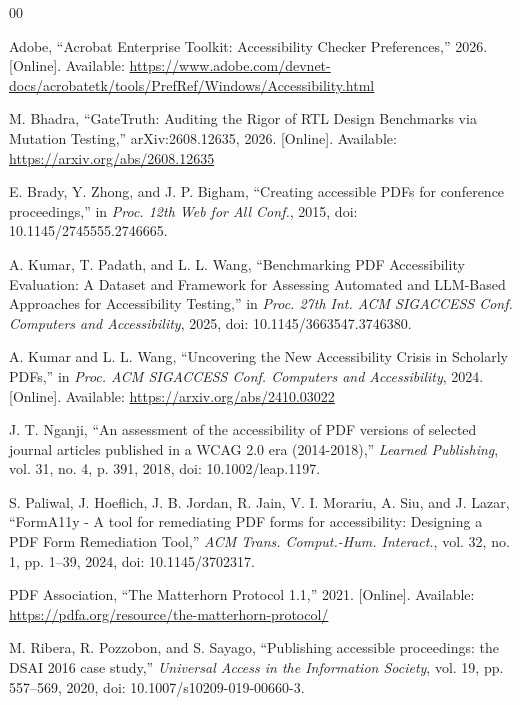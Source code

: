 \documentclass[conference]{IEEEtran}
\begin{document}
\begin{thebibliography}{00}

Adobe, ``Acrobat Enterprise Toolkit: Accessibility Checker Preferences,'' 2026. [Online]. Available: \url{https://www.adobe.com/devnet-docs/acrobatetk/tools/PrefRef/Windows/Accessibility.html}

M. Bhadra, ``GateTruth: Auditing the Rigor of RTL Design Benchmarks via Mutation Testing,'' arXiv:2608.12635, 2026. [Online]. Available: \url{https://arxiv.org/abs/2608.12635}

E. Brady, Y. Zhong, and J. P. Bigham, ``Creating accessible PDFs for conference proceedings,'' in \emph{Proc. 12th Web for All Conf.}, 2015, doi: 10.1145/2745555.2746665.

A. Kumar, T. Padath, and L. L. Wang, ``Benchmarking PDF Accessibility Evaluation: A Dataset and Framework for Assessing Automated and LLM-Based Approaches for Accessibility Testing,'' in \emph{Proc. 27th Int. ACM SIGACCESS Conf. Computers and Accessibility}, 2025, doi: 10.1145/3663547.3746380.

A. Kumar and L. L. Wang, ``Uncovering the New Accessibility Crisis in Scholarly PDFs,'' in \emph{Proc. ACM SIGACCESS Conf. Computers and Accessibility}, 2024. [Online]. Available: \url{https://arxiv.org/abs/2410.03022}

J. T. Nganji, ``An assessment of the accessibility of PDF versions of selected journal articles published in a WCAG 2.0 era (2014-2018),'' \emph{Learned Publishing}, vol. 31, no. 4, p. 391, 2018, doi: 10.1002/leap.1197.

S. Paliwal, J. Hoeflich, J. B. Jordan, R. Jain, V. I. Morariu, A. Siu, and J. Lazar, ``FormA11y - A tool for remediating PDF forms for accessibility: Designing a PDF Form Remediation Tool,'' \emph{ACM Trans. Comput.-Hum. Interact.}, vol. 32, no. 1, pp. 1--39, 2024, doi: 10.1145/3702317.

PDF Association, ``The Matterhorn Protocol 1.1,'' 2021. [Online]. Available: \url{https://pdfa.org/resource/the-matterhorn-protocol/}

M. Ribera, R. Pozzobon, and S. Sayago, ``Publishing accessible proceedings: the DSAI 2016 case study,'' \emph{Universal Access in the Information Society}, vol. 19, pp. 557--569, 2020, doi: 10.1007/s10209-019-00660-3.


\end{thebibliography}
\end{document}

